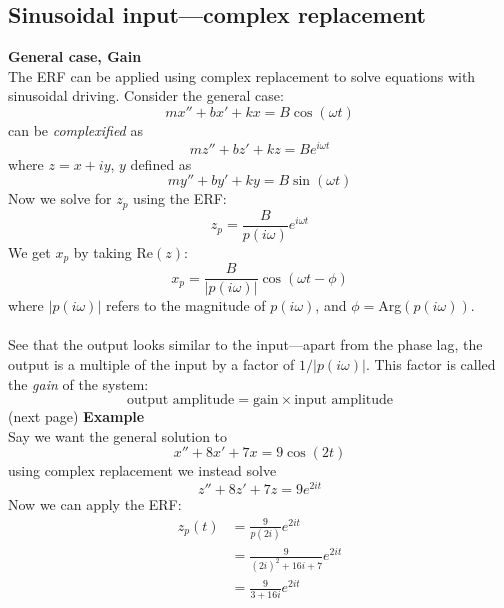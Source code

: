 \documentclass{report}
\begin{document}
\subsection{Sinusoidal input---complex replacement}
\textbf{General case, Gain}\\
The ERF can be applied using complex replacement to solve equations with sinusoidal driving. Consider the
general case:
\begin{equation*}
mx''+bx'+kx=B\cos(\omega t)
\end{equation*}
can be \textit{complexified} as
\begin{equation*}
mz''+bz'+kz=Be^{i\omega t}
\end{equation*}
where $z=x+iy$, $y$ defined as
\begin{equation*}
my''+by'+ky=B\sin(\omega t)
\end{equation*}
Now we solve for $z_p$ using the ERF:
\begin{equation*}
z_p=\frac{B}{p(i\omega)}e^{i\omega t}
\end{equation*}
We get $x_p$ by taking Re$(z)$:
\begin{equation*}
x_p=\frac{B}{|p(i\omega)|}\cos(\omega t-\phi)
\end{equation*}
where $|p(i\omega)|$ refers to the magnitude of $p(i\omega)$, and $\phi=$Arg$(p(i\omega))$.\\
\vspace{1mm}\\
See that the output looks similar to the input---apart from the phase lag, the output is a
multiple of the input by a factor of $1/|p(i\omega)|$. This factor is called the \textit{gain} of the system:
\begin{equation*}
\text{output amplitude}=\text{gain}\times\text{input amplitude}
\end{equation*}
(next page)
\newpage
\noindent\textbf{Example}\\
Say we want the general solution to 
\begin{equation*}
x''+8x'+7x=9\cos(2t)
\end{equation*}
using complex replacement we instead solve
\begin{equation*}
z''+8z'+7z=9e^{2it}
\end{equation*}
Now we can apply the ERF:
\begin{align*}
z_p(t)&=\frac{9}{p(2i)}e^{2it}\\
&=\frac{9}{(2i)^2+16i+7}e^{2it}\\
&=\frac{9}{3+16i}e^{2it}
\end{align*}
\end{document}

